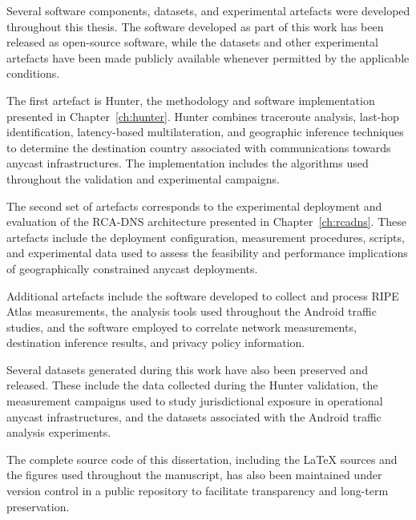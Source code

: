 \documentclass[
A4paper,                %
twoside,                %
openright,              %
chapterprefix=true,     %
12pt,                   %
headings=normal,        %
titlepage=on            %
]{book}
\begin{document}
Several software components, datasets, and experimental artefacts were developed throughout this thesis. The software developed as part of this work has been released as open-source software, while the datasets and other experimental artefacts have been made publicly available whenever permitted by the applicable conditions.

The first artefact is Hunter, the methodology and software implementation presented in Chapter~\ref{ch:hunter}. Hunter combines traceroute analysis, last-hop identification, latency-based multilateration, and geographic inference techniques to determine the destination country associated with communications towards anycast infrastructures. The implementation includes the algorithms used throughout the validation and experimental campaigns.

The second set of artefacts corresponds to the experimental deployment and evaluation of the RCA-DNS architecture presented in Chapter~\ref{ch:rcadns}. These artefacts include the deployment configuration, measurement procedures, scripts, and experimental data used to assess the feasibility and performance implications of geographically constrained anycast deployments.

Additional artefacts include the software developed to collect and process RIPE Atlas measurements, the analysis tools used throughout the Android traffic studies, and the software employed to correlate network measurements, destination inference results, and privacy policy information.

Several datasets generated during this work have also been preserved and released. These include the data collected during the Hunter validation, the measurement campaigns used to study jurisdictional exposure in operational anycast infrastructures, and the datasets associated with the Android traffic analysis experiments.

The complete source code of this dissertation, including the \LaTeX{} sources and the figures used throughout the manuscript, has also been maintained under version control in a public repository to facilitate transparency and long-term preservation.
\end{document}
